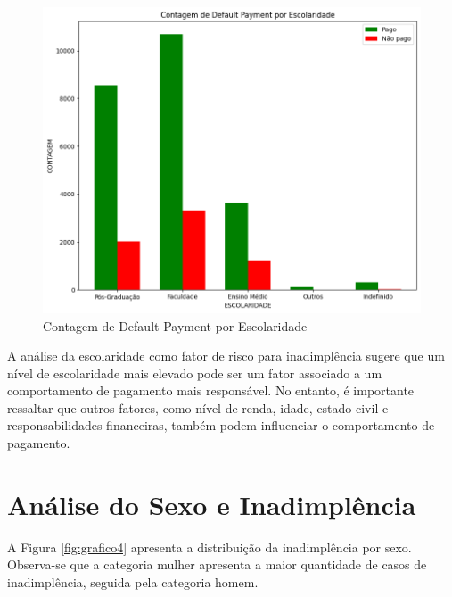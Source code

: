 \documentclass{abntpuc}
\begin{document}
\begin{figure}[H]
    \centering
    \includegraphics[width=\textwidth]{grafico3.png}
    \caption{Contagem de Default Payment por Escolaridade}
    \label{fig:grafico3}
\end{figure}

A análise da escolaridade como fator de risco para inadimplência sugere que um nível de escolaridade mais elevado pode ser um fator associado a um comportamento de pagamento mais responsável. No entanto, é importante ressaltar que outros fatores, como nível de renda, idade, estado civil e responsabilidades financeiras, também podem influenciar o comportamento de pagamento.

\section{Análise do Sexo e Inadimplência}

A Figura \ref{fig:grafico4} apresenta a distribuição da inadimplência por sexo. Observa-se que a categoria mulher apresenta a maior quantidade de casos de inadimplência, seguida pela categoria homem.
\end{document}

